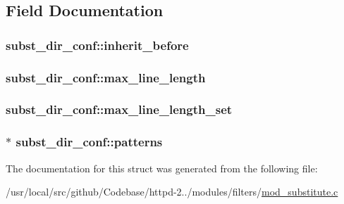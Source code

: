 \subsection{Field Documentation}
\subsubsection[{\texorpdfstring{inherit\+\_\+before}{inherit_before}}]{ subst\+\_\+dir\+\_\+conf\+::inherit\+\_\+before}\hypertarget{structsubst__dir__conf_a033b598bc3842f87bac799015508460a}{}\label{structsubst__dir__conf_a033b598bc3842f87bac799015508460a}
\subsubsection[{\texorpdfstring{max\+\_\+line\+\_\+length}{max_line_length}}]{ subst\+\_\+dir\+\_\+conf\+::max\+\_\+line\+\_\+length}\hypertarget{structsubst__dir__conf_a82e5b8db66214b799578439e6cb07f9f}{}\label{structsubst__dir__conf_a82e5b8db66214b799578439e6cb07f9f}
\subsubsection[{\texorpdfstring{max\+\_\+line\+\_\+length\+\_\+set}{max_line_length_set}}]{ subst\+\_\+dir\+\_\+conf\+::max\+\_\+line\+\_\+length\+\_\+set}\hypertarget{structsubst__dir__conf_a375e7df9a1786d0412349d4dc5993143}{}\label{structsubst__dir__conf_a375e7df9a1786d0412349d4dc5993143}
\subsubsection[{\texorpdfstring{patterns}{patterns}}]{$\ast$ subst\+\_\+dir\+\_\+conf\+::patterns}\hypertarget{structsubst__dir__conf_a09456624d687f9cf84cb0295ee328947}{}\label{structsubst__dir__conf_a09456624d687f9cf84cb0295ee328947}


The documentation for this struct was generated from the following file\+:\begin{DoxyCompactItemize}
\item 
/usr/local/src/github/\+Codebase/httpd-\/2../modules/filters/\hyperlink{mod__substitute_8c}{mod\+\_\+substitute.\+c}\end{DoxyCompactItemize}
